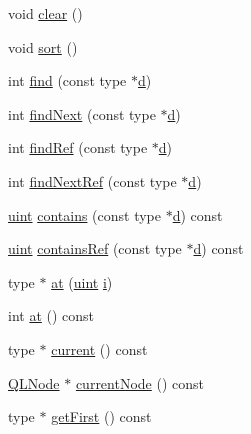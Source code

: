 \begin{DoxyCompactItemize}
\item 
void \hyperlink{class_q_internal_list_a253a49ac0bce39e819358a602cf16c20}{clear} ()
\item 
void \hyperlink{class_q_internal_list_ab01f43191858dfaf880edf6b19bfbb4d}{sort} ()
\item 
int \hyperlink{class_q_internal_list_a29473d9768c95f84b196253f31c5979d}{find} (const type $\ast$\hyperlink{060__command__switch_8tcl_af43f4b1f0064a33b2d662af9f06d3a00}{d})
\item 
int \hyperlink{class_q_internal_list_a1b3c68c7eb59847ae46040e5aaa1679a}{find\+Next} (const type $\ast$\hyperlink{060__command__switch_8tcl_af43f4b1f0064a33b2d662af9f06d3a00}{d})
\item 
int \hyperlink{class_q_internal_list_a814aac1d1607da1df00372fb6b02617f}{find\+Ref} (const type $\ast$\hyperlink{060__command__switch_8tcl_af43f4b1f0064a33b2d662af9f06d3a00}{d})
\item 
int \hyperlink{class_q_internal_list_ab7bfec717081f3bb7d0c2e3a811544c3}{find\+Next\+Ref} (const type $\ast$\hyperlink{060__command__switch_8tcl_af43f4b1f0064a33b2d662af9f06d3a00}{d})
\item 
\hyperlink{qglobal_8h_a4d3943ddea65db7163a58e6c7e8df95a}{uint} \hyperlink{class_q_internal_list_a3a56e35f43f4772e41d82c8b510a1ac7}{contains} (const type $\ast$\hyperlink{060__command__switch_8tcl_af43f4b1f0064a33b2d662af9f06d3a00}{d}) const 
\item 
\hyperlink{qglobal_8h_a4d3943ddea65db7163a58e6c7e8df95a}{uint} \hyperlink{class_q_internal_list_a1b944fd95a685d91ba77ba41c8ea0aa6}{contains\+Ref} (const type $\ast$\hyperlink{060__command__switch_8tcl_af43f4b1f0064a33b2d662af9f06d3a00}{d}) const 
\item 
type $\ast$ \hyperlink{class_q_internal_list_a339c4e193ab4b87c102da0b9caeaa585}{at} (\hyperlink{qglobal_8h_a4d3943ddea65db7163a58e6c7e8df95a}{uint} \hyperlink{060__command__switch_8tcl_a8c90afd4641b25be86bd09983c3cbee0}{i})
\item 
int \hyperlink{class_q_internal_list_a704294546777d7ed8da0ff3da8072096}{at} () const 
\item 
type $\ast$ \hyperlink{class_q_internal_list_afb7a09b01c69d1d5a291d7c4d0f6d2ec}{current} () const 
\item 
\hyperlink{class_q_l_node}{Q\+L\+Node} $\ast$ \hyperlink{class_q_internal_list_a6349d9bb8983f59e30731dbc0051d0ac}{current\+Node} () const 
\item 
type $\ast$ \hyperlink{class_q_internal_list_afde69b3d1f7569651d0d87be54b495d6}{get\+First} () const 

\end{DoxyCompactItemize}
